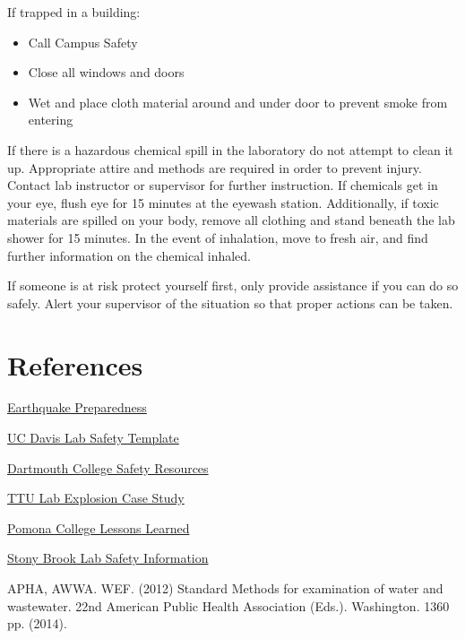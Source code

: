 \documentclass[12pt]{../SOP3_beta}
\begin{document}
\NP If trapped in a building:
\begin{itemize}
  \item Call Campus Safety
  \item Close all windows and doors\
  \item Wet and place cloth material around and under door to prevent smoke from entering
\end{itemize}

\NP If there is a hazardous chemical spill in the laboratory do not attempt to clean it up.  Appropriate attire and methods are required in order to prevent injury.  Contact lab instructor or supervisor for further instruction. If chemicals get in your eye, flush eye for 15 minutes at the eyewash station.  Additionally, if toxic materials are spilled on your body, remove all clothing and stand beneath the lab shower for 15 minutes. In the event of inhalation, move to fresh air, and find further information on the chemical inhaled.  

\NP If someone is at risk protect yourself first, only provide assistance if you can do so safely.  Alert your supervisor of the situation so that proper actions can be taken.

\section{References}

\NP \href{http://emergency.cdc.gov/disasters/earthquakes/prepared.asp}{Earthquake Preparedness}

\NP \href{http://safetyservices.ucdavis.edu/sites/default/files/documents/LabSafetyPlan_Template.docx}{UC Davis Lab Safety Template}

\NP \href{https://www.dartmouth.edu/~chemlab/info/safety/hazards.html}{Dartmouth College Safety Resources}

\NP \href{http://www.csb.gov/file.aspx?DocumentId=420}{TTU Lab Explosion Case Study}

\NP \href{https://sakai.claremont.edu/access/content/group/CX_mtg_87013/Project%201%3A%20Lab%20and%20Field%20Safety/Lessons%20Learned/Lesson_Learned_Report.pdf}{Pomona College Lessons Learned}

\NP \href{https://ehs.stonybrook.edu/programs/laboratory-safety}{Stony Brook Lab Safety Information}

\NP APHA, AWWA. WEF. (2012) Standard Methods for examination of water and wastewater. 22nd American Public Health Association (Eds.). Washington. 1360 pp. (2014).
\end{document}
